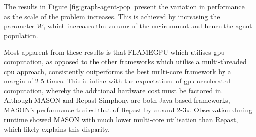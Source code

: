   The results in Figure \ref{fig:graph-agent-pop} present the variation in performance as the scale of the problem increases. This is achieved by increasing the parameter $W$, which increases the volume of the environment and hence the agent population.
  
  Most apparent from these results is that FLAMEGPU which utilises \gls{gpu} computation, as opposed to the other frameworks which utilise a multi-threaded \gls{cpu} approach, consistently outperforms the best multi-core framework by a margin of 2-5 times. This is inline with the expectations of \gls{gpu} accelerated computation\cite{LK*10}, whereby the additional hardware cost must be factored in. Although MASON and Repast Simphony are both Java based frameworks, MASON's performance trailed that of Repast by around 2-3x. Observation during runtime showed MASON with much lower multi-core utilisation than Repast, which likely explains this disparity.
